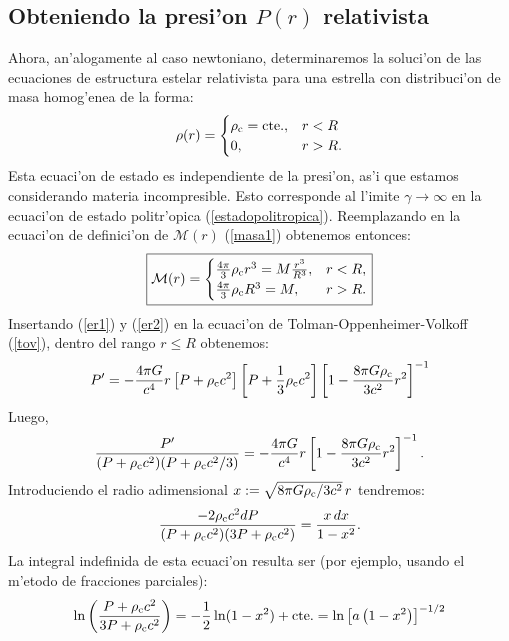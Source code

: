 \subsection{Obteniendo la presi'on  \texorpdfstring{$P(r)$}{P(r)} relativista}
Ahora, an'alogamente al caso newtoniano, determinaremos la soluci'on de las ecuaciones de estructura estelar relativista para una estrella con distribuci'on de masa homog'enea de la forma:
\begin{equation}\label{er1}
 \rho(r)=\begin{cases}
  \rho_{\rm c}=\text{cte.}, & r<R\\
  0, & r>R.
\end{cases}
\end{equation}
Esta ecuaci'on de estado es independiente de la presi'on, as'i que estamos considerando materia incompresible. Esto corresponde al l'imite $\gamma\rightarrow\infty$ en la ecuaci'on de estado politr'opica (\ref{estadopolitropica}). Reemplazando en la ecuaci'on de definici'on de $\mathcal{M}(r)$ (\ref{masa1}) obtenemos entonces:
\begin{equation}\label{er2}
\boxed{\mathcal{M}(r)=\begin{cases}
\frac{4\pi}{3}\rho_{\rm c}r^3=M\frac{r^3}{R^3}, &r<R,\\
\frac{4\pi}{3}\rho_{\rm c}R^3=M,  & r > R.
\end{cases}}
\end{equation}
Insertando (\ref{er1}) y (\ref{er2}) en la ecuaci'on de Tolman-Oppenheimer-Volkoff (\ref{tov}), dentro del rango $r\leq R$ obtenemos:
\begin{align}
 P'=-\frac{4\pi G}{c^4}r\left[P+\rho_{\rm c} c^2\right]\left[P+\frac{1}{3}\rho_{\rm c}c^2\right]\left[ 1-\frac{8\pi G\rho_{\rm c}}{3c^2}r^2\right]^{-1}
\end{align}
Luego,
\begin{equation}\label{densidadcte1}
\frac{P'}{(P+\rho_{\rm c}c^2)(P+\rho_{\rm c}c^2/3)}=-\frac{4\pi G}{c^{4}}r\left[ 1-\frac{8\pi G\rho_{\rm c}}{3c^2}r^2\right]^{-1}.
\end{equation}
Introduciendo el radio adimensional $x:=\sqrt{8\pi G\rho_{\rm c}/3c^2}\,r$ tendremos:
\begin{equation}
\frac{-2\rho_{\rm c}c^2dP}{(P+\rho_{\rm c}c^2)(3P+\rho_{\rm c}c^2)}=\frac{x\,dx}{1-x^2}.
\end{equation}
La integral indefinida de esta ecuaci'on resulta ser (por ejemplo, usando el m'etodo de fracciones parciales):
\begin{equation}\label{Prhoc}
\ln\left( \frac{P+\rho_{\rm c}c^2}{3P+\rho_{\rm c}c^2}\right)=-\frac{1}{2}\ln(1-x^2)+\text{cte.}=\ln\left[a\left(1-x^2\right)\right]^{-1/2}
\end{equation}
